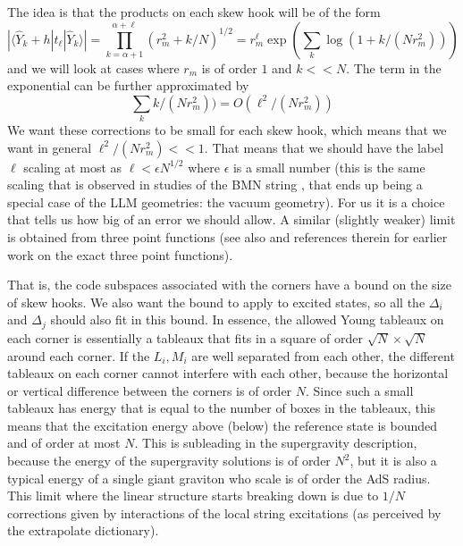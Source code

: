 \documentclass[12pt,nofootinbib, longbibliography]{revtex4-1}
\newcommand\ket[1]{| #1\rangle}
\newcommand\bra[1]{\langle #1|}
\begin{document}
The idea is that the products on each skew hook will be of the form
\begin{equation}
|\bra{\hat Y_k+h} t_\ell \ket{\hat Y_k}|=\prod_{k=\alpha+1}^{\alpha+\ell}\left(r^2_m + k/ N \right)^{1/2}= r_m^{\ell} \exp( \sum_k \log (1+ k/(N r^2_m)))
\end{equation}
and we will look at cases where $r_m$ is of order $1$ and $k<<N$. The term in the exponential  can be further approximated by
 \begin{equation}
\sum_k  k/(N r^2_m))= O( \ell^2/( N r_m^2))
 \end{equation}
We want these corrections to be small for each skew hook, which means that we want in general $ \ell^2/( N r_m^2)<< 1$. That means that we should have the label $\ell$ scaling at most as $\ell< \epsilon N^{1/2}$ where $\epsilon$ is a small number (this is the same scaling that is observed in studies of the BMN string \cite{Kristjansen:2002bb}, that ends up being a special case of the LLM geometries: the vacuum geometry). For us it is a choice that tells us how big of an error we should allow. A similar (slightly weaker) limit is obtained from three point functions \cite{Garner:2014kna} (see also \cite{Dhar:2005su} and references therein for earlier work on the exact three point functions).

That is, the code subspaces associated with the corners have a bound on the size of skew hooks. We also want the bound to apply to excited states, so all the $\Delta_i$ and $\Delta_j$ should also fit in this bound. In essence, the allowed Young tableaux on each corner is essentially a tableaux that fits in a square of order $\sqrt N\times \sqrt N$ around each corner.
If the $L_i, M_i$ are well separated from each other, the different tableaux on each corner cannot interfere with each other, because the horizontal or vertical difference between the corners 
is of order $N$. Since such a small tableaux has energy that is equal to the number of boxes in the tableaux, this means that the excitation energy above (below) the reference state is bounded and of order at most $N$. This is subleading in the supergravity 
description, because the energy of the supergravity solutions is of order $N^2$, but it is also a typical energy of a single giant graviton who scale is of order the AdS radius. This limit where the linear structure starts breaking down is due to $1/N$ corrections given by interactions of the local string excitations (as perceived by the extrapolate dictionary). 
\end{document}
